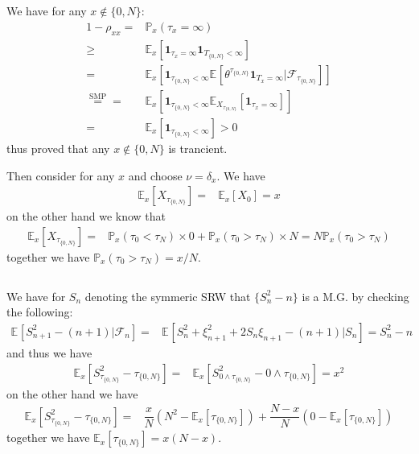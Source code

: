 \documentclass[11pt,a4paper]{ctexart}
\numberwithin{equation}{section}%
\newcommand{\F}{\mathcal{F}}
\begin{document}
\subsection{}

We have for any $ x\not\in \{0,N\} $:
\begin{align*}
    1-\rho _{xx}=& \mathbb{P}_{ x }\left( \tau_x=\infty \right)  \\
    \geq& \mathbb{E}_{ x }\left[ \mathbf{1}_{\tau_x=\infty} \mathbf{1}_{T_{\{0,N\}}<\infty} \right]\\
    =& \mathbb{E}_{ x }\left[ \mathbf{1}_{\tau_{\{0,N\}}<\infty} \mathbb{E}_{  }\left[ \theta ^{\tau_{\{0,N\}}}\mathbf{1}_{T_x=\infty} | \F_{\tau_{\{0,N\}}} \right]  \right]\\
    \mathop{ = }\limits^{\text{SMP}}=& \mathbb{E}_{ x }\left[ \mathbf{1}_{\tau_{\{0,N\}}<\infty} \mathbb{E}_{ X_{\tau_{\{0,N\}}} }\left[ \mathbf{1}_{\tau_x=\infty}  \right]  \right]\\   
    =&\mathbb{E}_{ x }\left[ \mathbf{1}_{\tau_{\{0,N\}}<\infty} \right] >0
\end{align*}
thus proved that any $  x\not\in \{0,N\} $ is trancient.

Then consider for any $ x $ and choose $ \nu = \delta _x $. We have
\begin{align*}
    \mathbb{E}_{ x }\left[ X_{\tau_{\{0,N\}}} \right] =& \mathbb{E}_{ x }\left[ X_0 \right] = x 
\end{align*}
on the other hand we know that
\begin{align*}
     \mathbb{E}_{ x }\left[ X_{\tau_{\{0,N\}}} \right] =& \mathbb{P}_{ x }\left( \tau_0<\tau_N \right) \times 0 + \mathbb{P}_{ x }\left( \tau_0>\tau_N \right) \times N = N\mathbb{P}_{ x }\left( \tau_0>\tau_N \right) 
\end{align*}
together we have $ \mathbb{P}_{ x }\left( \tau_0>\tau_N \right) = x/N $.


\subsection{}

We have for $ S_n $ denoting the symmeric SRW that $ \{S_n^2-n\} $ is a M.G. by checking the following:
\begin{align*}
    \mathbb{E}_{  }\left[ S^2_{n+1} - (n+1)|\F_n \right] =& \mathbb{E}_{  }\left[ S_n^2 + \xi _{n+1}^2 + 2S_n\xi _{n+1} - (n+1) |S_n \right] = S_n^2 -n
\end{align*}
and thus we have
\begin{align*}
    \mathbb{E}_{ x }\left[ S^2_{ \tau_{\{0,N\}}} - \tau_{\{0,N\}}\right]  =& \mathbb{E}_{ x }\left[ S^2_{0\wedge \tau_{\{0,N\}}} - 0\wedge \tau_{\{0,N\}} \right] =x^2
\end{align*}
on the other hand we have
\begin{align*}
    \mathbb{E}_{ x }\left[ S^2_{ \tau_{\{0,N\}}} - \tau_{\{0,N\}}\right]  =& \dfrac{ x }{ N }(N^2 - \mathbb{E}_{ x }\left[  \tau_{\{0,N\}} \right]) + \dfrac{ N-x }{ N }(0 - \mathbb{E}_{ x }\left[  \tau_{\{0,N\}} \right]) 
\end{align*}
together we have $ \mathbb{E}_{ x }\left[  \tau_{\{0,N\}} \right] = x(N-x) $.
\end{document}
